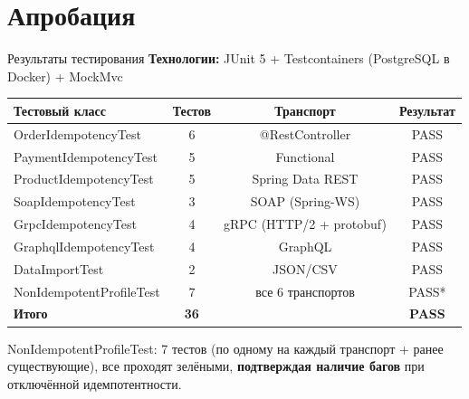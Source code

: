 \documentclass[aspectratio=169]{beamer}
\begin{document}
\section{Апробация}
\begin{frame}{Результаты тестирования}
\textbf{Технологии:} JUnit 5 + Testcontainers (PostgreSQL в Docker) + MockMvc

\vspace{3mm}
\begin{table}
\centering
\scriptsize
\begin{tabular}{@{}lccc@{}}
\toprule
\textbf{Тестовый класс} & \textbf{Тестов} & \textbf{Транспорт} & \textbf{Результат} \\
\midrule
OrderIdempotencyTest       & 6 & @RestController             & \textcolor{green!70!black}{PASS} \\
PaymentIdempotencyTest     & 5 & Functional                  & \textcolor{green!70!black}{PASS} \\
ProductIdempotencyTest     & 5 & Spring Data REST            & \textcolor{green!70!black}{PASS} \\
SoapIdempotencyTest        & 3 & SOAP (Spring-WS)            & \textcolor{green!70!black}{PASS} \\
GrpcIdempotencyTest        & 4 & gRPC (HTTP/2 + protobuf)    & \textcolor{green!70!black}{PASS} \\
GraphqlIdempotencyTest     & 4 & GraphQL                     & \textcolor{green!70!black}{PASS} \\
DataImportTest             & 2 & JSON/CSV                    & \textcolor{green!70!black}{PASS} \\
\midrule
NonIdempotentProfileTest   & 7 & все 6 транспортов           & \textcolor{green!70!black}{PASS*} \\
\midrule
\textbf{Итого}             & \textbf{36} & & \textbf{PASS} \\
\bottomrule
\end{tabular}
\end{table}

\vspace{2mm}
\footnotesize *NonIdempotentProfileTest: 7 тестов (по одному на каждый транспорт + ранее существующие), все проходят зелёными, \textbf{подтверждая наличие багов} при отключённой идемпотентности.
\end{frame}
\end{document}
